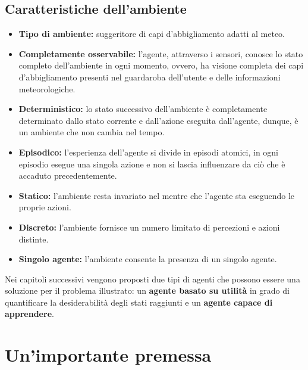 \documentclass[a4paper, 11pt, oneside]{report}
\begin{document}
            \subsection{Caratteristiche dell'ambiente}
                \begin{itemize}
                    \item \textbf{Tipo di ambiente:} suggeritore di capi d'abbigliamento adatti al meteo.
                    \item \textbf{Completamente osservabile:} l'agente, attraverso i sensori, conosce lo stato
                    completo dell'ambiente in ogni momento, ovvero, ha visione completa dei capi d'abbigliamento presenti
                    nel guardaroba dell'utente e delle informazioni meteorologiche.
                    \item \textbf{Deterministico:} lo stato successivo dell'ambiente è completamente determinato dallo
                    stato corrente e dall'azione eseguita dall'agente, dunque, è un ambiente che non cambia nel tempo.
                    \item \textbf{Episodico:} l'esperienza dell'agente si divide in episodi atomici, in ogni episodio
                    esegue una singola azione e non si lascia influenzare da ciò che è accaduto precedentemente.
                    \item \textbf{Statico:} l'ambiente resta invariato nel mentre che l'agente sta eseguendo le proprie azioni.
                    \item \textbf{Discreto:} l'ambiente fornisce un numero limitato di percezioni e azioni distinte.
                    \item \textbf{Singolo agente:} l'ambiente consente la presenza di un singolo agente.
                \end{itemize}
                \medskip
                \par \noindent Nei capitoli successivi vengono proposti due tipi di agenti che possono essere una soluzione per il problema illustrato:
                 un \textbf{agente basato su utilità} in grado di quantificare la desiderabilità
                degli stati raggiunti e un \textbf{agente capace di apprendere}.
    \bigskip
    \section{Un'importante premessa}
    \label{sec:premessa}
\end{document}
